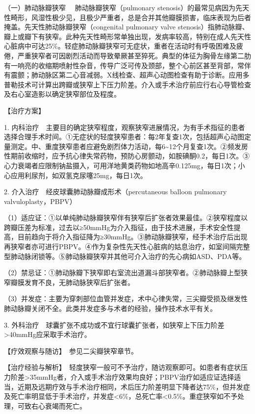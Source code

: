 {（一）肺动脉瓣狭窄} 　肺动脉瓣狭窄（pulmonary
stenosis）的最常见病因为先天性畸形，风湿性极少见，且极少严重者，总是合并其他瓣膜损害，临床表现为后者掩盖。先天性肺动脉瓣狭窄（congenital
pulmonary valve
stenosis）指肺动脉瓣、瓣上或瓣下有狭窄。此种先天性畸形常单独出现，发病率较高，特别在成人先天性心脏病中可达25\%。轻症肺动脉瓣狭窄可无症状，重者在活动时有呼吸困难及疲倦，严重狭窄者可因剧烈活动而导致晕厥甚至猝死。典型的体征为胸骨左缘第二肋有一响亮的收缩期喷射性杂音，传导广泛可传及颈部，整个心前区甚至背部，常伴有震颤；肺动脉区第二心音减弱。X线检查、超声心动图检查有助于诊断。应用多普勒技术可计算出跨瓣或狭窄上下压力阶差。介入或手术治疗前应行右心导管检查及右心室造影以确定狭窄部位及程度。

【治疗方案】

1.
内科治疗　主要目的确定狭窄程度，观察狭窄进展情况，为有手术指征的患者选择合理手术时间。①无症状的轻度狭窄患者：每2年复查1次，包括超声心动图定量测定。中、重度狭窄患者应避免剧烈体力活动，每6\textasciitilde{}12个月复查1次。②频发房性期前收缩时，应予抗心律失常药物，预防心房颤动，如胺碘酮0.2，每日1次。③心力衰竭者应限制钠盐摄入，可用洋地黄类药物如地高辛0.125mg，每日1次；小心应用利尿剂，如双氢克尿噻25mg，每日1次。

2. 介入治疗　经皮球囊肺动脉瓣成形术（percutaneous balloon pulmonary
valvuloplasty，PBPV）

（1）适应证：①以单纯肺动脉瓣狭窄伴有狭窄后扩张者效果最佳。②狭窄程度以跨瓣压差为标准，过去以≥50mmHg为介入指征，由于技术进展，手术安全性提高，目前趋向于将介入指征降为≥30mmHg。③肺动脉瓣狭窄，经手术治疗后出现再狭窄者亦可进行PBPV。④作为复杂性先天性心脏病的姑息治疗，如室间隔完整型肺动脉闭锁等。⑤肺动脉瓣狭窄并其他可介入治疗的先心病如ASD、PDA等。

（2）禁忌证：①肺动脉瓣下狭窄即右室流出道漏斗部狭窄者。②肺动脉瓣上型狭窄瓣膜发育不良，无肺动脉狭窄后扩张者。

（3）并发症：主要为穿刺部位血管并发症，术中心律失常，三尖瓣受损及继发性肺动脉瓣关闭不全。此类并发症多与术者的经验，操作技术水平有关。

3.
外科治疗　球囊扩张不成功或不宜行球囊扩张者，如狭窄上下压力阶差\textgreater{}40mmHg应采取手术治疗。

【疗效观察与随访】　参见二尖瓣狭窄章节。

【治疗经验与解析】　轻度狭窄一般可不予治疗，随访观察即可。如患者有症状压力阶差\textgreater{}35mmHg者，介入或手术治疗效果均良好；PBPV治疗如适应证选择适当，近期及远期疗效与手术治疗相同，术后压力阶差明显下降者达75\%，但并发症及死亡率明显低于手术治疗，并发症\textless{}6\%，总死亡率\textless{}0.5\%。重症狭窄如不予处理，可致右心衰竭而死亡。

